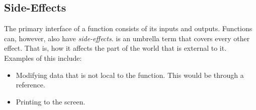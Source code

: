 





\subsection{Side-Effects}
\label{sec:func:csharp:sideeffects}

The primary interface of a function consists of its inputs and outputs. Functions can, however, also have \textsl{side-effects}.  is an umbrella term that covers every other effect. That is, how it affects the part of the world that is external to it. Examples of this include:
\begin{itemize}
  \item Modifying data that is not local to the function. This would be through a reference.
  \item Printing to the screen.
\end{itemize}

